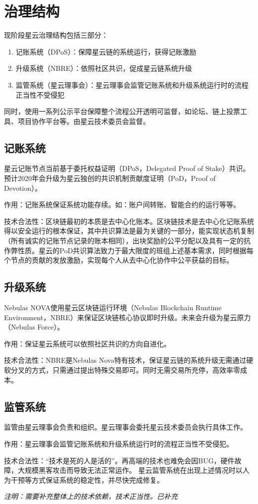\section{治理结构}
现阶段星云治理结构包括三部分：
\begin{enumerate}
	\item 记账系统（DPoS）：保障星云链的系统运行，获得记账激励
	\item 升级系统（NBRE）：依照社区共识，促成星云链系统升级
	\item 监管系统（星云理事会）：星云理事会监管记账系统和升级系统运行时的流程正当性不受侵犯	
\end{enumerate}
同时，使用一系列公示平台保障整个流程公开透明可监督，如论坛、链上投票工具、项目协作平台等。由星云技术委员会监督。

\subsection{记账系统}
星云记账节点当前基于委托权益证明（DPoS，Delegated Proof of Stake）共识。预计2020年会升级为星云独创的共识机制贡献度证明（PoD，Proof of Devotion）。

作用：记账系统保证系统功能存续。如：账户间转账、智能合约的运行等等。

技术合法性：区块链最初的本质是去中心化账本。区块链技术是去中心化记账系统得以安全运行的根本保证，其中共识算法是最为关键的一部分，能实现状态机复制（所有诚实的记账节点记录的账本相同），出块奖励的公平分配以及具有一定的抗作弊性质。星云的PoD共识算法致力于最大限度的班组上述基本需求，同时根据每个节点的贡献的发放激励，实现每个人从去中心化协作中公平获益的目标。

\subsection{升级系统}
Nebulas NOVA使用星云区块链运行环境（Nebulas Blockchain Runtime Environment，NBRE）来保证区块链核心协议即时升级。未来会升级为星云原力（Nebulas Force）。

作用：保证星云系统可以依照社区共识的方向自进化。

技术合法性：NBRE是Nebulas Nova特有技术，保证星云链的系统升级无需通过硬软分叉的方式，只需通过提出特殊交易即可。同时无需交易所充停，高效率零成本。

\subsection{监管系统}
监管由星云理事会负责和组织。星云理事会委托星云技术委员会执行具体工作。

作用：星云理事会监管记账系统和升级系统运行时的流程正当性不受侵犯。

技术合法性：“技术是死的人是活的”。再高端的技术也难免会因BUG，硬件故障，大规模黑客攻击而导致无法正常运作。	星云监管系统在出现上述情况时以人为干预等方式保证系统的稳定性，并尽快完成修复。

\emph{注明：需要补充整体上的技术依赖，技术正当性。}\emph{已补充}



